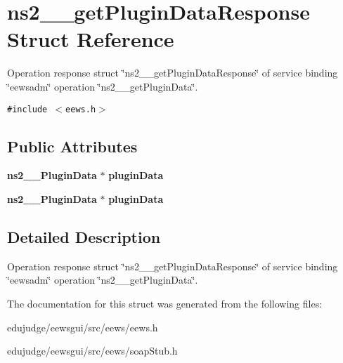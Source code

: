 \section{ns2\_\-\_\-getPluginDataResponse Struct Reference}
\label{structns2____getPluginDataResponse}
Operation response struct \char`\"{}ns2\_\-\_\-getPluginDataResponse\char`\"{} of service binding \char`\"{}eewsadm\char`\"{} operation \char`\"{}ns2\_\-\_\-getPluginData\char`\"{}.  


{\tt \#include $<$eews.h$>$}

\subsection*{Public Attributes}
\begin{CompactItemize}
\item 
{\bf ns2\_\-\_\-PluginData} $\ast$ \textbf{pluginData}\label{structns2____getPluginDataResponse_70f9d0c7a8e525b4255daec9eb14b9b9}

\item 
{\bf ns2\_\-\_\-PluginData} $\ast$ \textbf{pluginData}\label{structns2____getPluginDataResponse_70f9d0c7a8e525b4255daec9eb14b9b9}

\end{CompactItemize}


\subsection{Detailed Description}
Operation response struct \char`\"{}ns2\_\-\_\-getPluginDataResponse\char`\"{} of service binding \char`\"{}eewsadm\char`\"{} operation \char`\"{}ns2\_\-\_\-getPluginData\char`\"{}. 

The documentation for this struct was generated from the following files:\begin{CompactItemize}
\item 
edujudge/eewsgui/src/eews/eews.h\item 
edujudge/eewsgui/src/eews/soapStub.h\end{CompactItemize}
